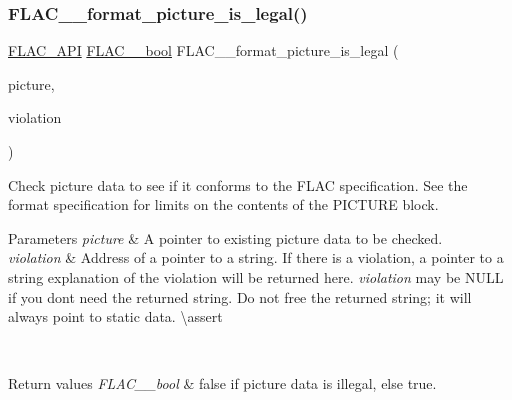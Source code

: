 \subsubsection{\texorpdfstring{FLAC\_\_format\_picture\_is\_legal()}{FLAC\_\_format\_picture\_is\_legal()}}
{\footnotesize\ttfamily \mbox{\hyperlink{group__flac__export_ga56ca07df8a23310707732b1c0007d6f5}{F\+L\+A\+C\+\_\+\+A\+PI}} \mbox{\hyperlink{ordinals_8h_a95103469f1cbd78b8cf250194985b34e}{F\+L\+A\+C\+\_\+\+\_\+bool}} F\+L\+A\+C\+\_\+\+\_\+format\+\_\+picture\+\_\+is\+\_\+legal (\begin{DoxyParamCaption}\item[{const \mbox{\hyperlink{struct_f_l_a_c_____stream_metadata___picture}{F\+L\+A\+C\+\_\+\+\_\+\+Stream\+Metadata\+\_\+\+Picture}} $\ast$}]{picture,  }\item[{const char $\ast$$\ast$}]{violation }\end{DoxyParamCaption})}

Check picture data to see if it conforms to the F\+L\+AC specification. See the format specification for limits on the contents of the P\+I\+C\+T\+U\+RE block.


\begin{DoxyParams}{Parameters}
{\em picture} & A pointer to existing picture data to be checked. \\
\hline
{\em violation} & Address of a pointer to a string. If there is a violation, a pointer to a string explanation of the violation will be returned here. {\itshape violation} may be {\ttfamily N\+U\+LL} if you don\textquotesingle{}t need the returned string. Do not free the returned string; it will always point to static data. \textbackslash{}assert 
\begin{DoxyCode}{1}
\end{DoxyCode}
 \\
\hline
\end{DoxyParams}

\begin{DoxyRetVals}{Return values}
{\em F\+L\+A\+C\+\_\+\+\_\+bool} & {\ttfamily false} if picture data is illegal, else {\ttfamily true}. \\
\hline
\end{DoxyRetVals}
\mbox{\label{group__flac__format_ga996f8732a2502ad79a68bb4a9f945235}} 
